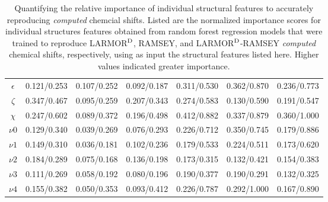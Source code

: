 \documentclass[fleqn,10pt]{wlscirep}
\begin{document}
\begin{table}
\begin{threeparttable}
\begin{tabular}{c c c c c c c}
$\epsilon$                             &  0.121/0.253  & 0.107/0.252& 0.092/0.187            &  0.311/0.530 & 0.362/0.870 &   0.236/0.773 \\
$\zeta$                                &  0.347/0.467  & 0.095/0.259& 0.207/0.343            &  0.274/0.583 & 0.130/0.590 &   0.191/0.547 \\
$\chi$                                 &  0.247/0.602  & 0.089/0.372& 0.196/0.498            &  0.412/0.882 & 0.337/0.879 &   0.360/1.000 \\
$\nu{0}$                               &  0.129/0.340  & 0.039/0.269& 0.076/0.293            &  0.226/0.712 & 0.350/0.745 &   0.179/0.886 \\
$\nu{1}$                               &  0.149/0.310  & 0.036/0.181& 0.102/0.236            &  0.179/0.533 & 0.224/0.511 &   0.173/0.620 \\
$\nu{2}$                               &  0.184/0.289  & 0.075/0.168& 0.136/0.198            &  0.173/0.315 & 0.132/0.421 &   0.154/0.383 \\
$\nu{3}$                               &  0.111/0.269  & 0.058/0.192& 0.080/0.196            &  0.190/0.377 & 0.190/0.291 &   0.132/0.325 \\
$\nu{4}$                               &  0.155/0.382  & 0.050/0.353& 0.093/0.412            &  0.226/0.787 & 0.292/1.000 &   0.167/0.890 \\
 
\hline
\end{tabular}
\begin{tablenotes}
\end{tablenotes}
\end{threeparttable}
\caption{\label{tab:structure_importance} Quantifying the relative importance of individual structural features to accurately reproducing \textit{computed} chemcial shifts. Listed are the normalized importance scores for individual structures features obtained from random forest regression models that were trained to reproduce LARMOR$^{\rm D}$, RAMSEY, and LARMOR$^{\rm D}$-RAMSEY \textit{computed} chemical shifts, respectively, using as input the structural features listed here. Higher values indicated greater importance.}
\end{table}
\end{document}
